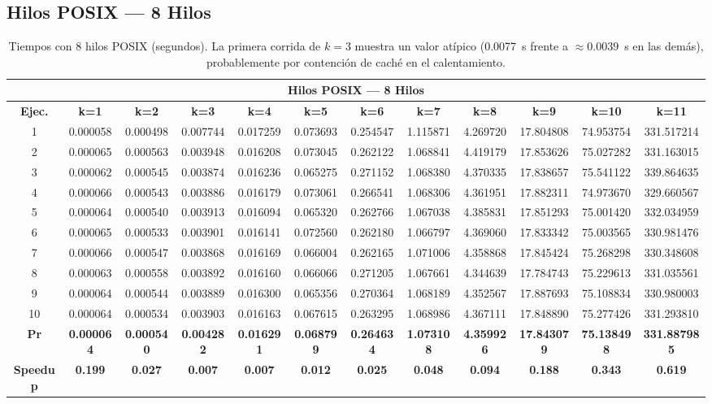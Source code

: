 \documentclass{article}
\begin{document}
\subsection{Hilos POSIX --- 8 Hilos}

\begin{table}[H]
\centering
\tiny
\begin{tabular}{|c|c|c|c|c|c|c|c|c|c|c|c|}
\hline
\multicolumn{12}{|c|}{\textbf{Hilos POSIX --- 8 Hilos}} \\
\hline
\textbf{Ejec.} & \textbf{k=1} & \textbf{k=2} & \textbf{k=3} & \textbf{k=4} & \textbf{k=5} & \textbf{k=6} & \textbf{k=7} & \textbf{k=8} & \textbf{k=9} & \textbf{k=10} & \textbf{k=11} \\
\hline
1  & 0.000058 & 0.000498 & 0.007744 & 0.017259 & 0.073693 & 0.254547 & 1.115871 & 4.269720 & 17.804808 & 74.953754 & 331.517214 \\
2  & 0.000065 & 0.000563 & 0.003948 & 0.016208 & 0.073045 & 0.262122 & 1.068841 & 4.419179 & 17.853626 & 75.027282 & 331.163015 \\
3  & 0.000062 & 0.000545 & 0.003874 & 0.016236 & 0.065275 & 0.271152 & 1.068380 & 4.370335 & 17.838657 & 75.541122 & 339.864635 \\
4  & 0.000066 & 0.000543 & 0.003886 & 0.016179 & 0.073061 & 0.266541 & 1.068306 & 4.361951 & 17.882311 & 74.973670 & 329.660567 \\
5  & 0.000064 & 0.000540 & 0.003913 & 0.016094 & 0.065320 & 0.262766 & 1.067038 & 4.385831 & 17.851293 & 75.001420 & 332.034959 \\
6  & 0.000065 & 0.000533 & 0.003901 & 0.016141 & 0.072560 & 0.262180 & 1.066797 & 4.369060 & 17.833342 & 75.003565 & 330.981476 \\
7  & 0.000066 & 0.000547 & 0.003868 & 0.016169 & 0.066004 & 0.262165 & 1.071006 & 4.358868 & 17.845424 & 75.268298 & 330.348608 \\
8  & 0.000063 & 0.000558 & 0.003892 & 0.016160 & 0.066066 & 0.271205 & 1.067661 & 4.344639 & 17.784743 & 75.229613 & 331.035561 \\
9  & 0.000064 & 0.000544 & 0.003889 & 0.016300 & 0.065356 & 0.270364 & 1.068189 & 4.352567 & 17.887693 & 75.108834 & 330.980003 \\
10 & 0.000064 & 0.000534 & 0.003903 & 0.016163 & 0.067615 & 0.263295 & 1.068986 & 4.367111 & 17.848890 & 75.277426 & 331.293810 \\
\hline
\textbf{Pr} & \textbf{0.000064} & \textbf{0.000540} & \textbf{0.004282} & \textbf{0.016291} & \textbf{0.068799} & \textbf{0.264634} & \textbf{1.073108} & \textbf{4.359926} & \textbf{17.843079} & \textbf{75.138498} & \textbf{331.887985} \\
\hline
\textbf{Speedup} & \textbf{0.199} & \textbf{0.027} & \textbf{0.007} & \textbf{0.007} & \textbf{0.012} & \textbf{0.025} & \textbf{0.048} & \textbf{0.094} & \textbf{0.188} & \textbf{0.343} & \textbf{0.619} \\
\hline
\end{tabular}
\caption{Tiempos con 8 hilos POSIX (segundos). La primera corrida de $k=3$ muestra un valor atípico (0.0077~s frente a $\approx0.0039$~s en las demás), probablemente por contención de caché en el calentamiento.}
\label{tab:t8}
\end{table}
\end{document}
